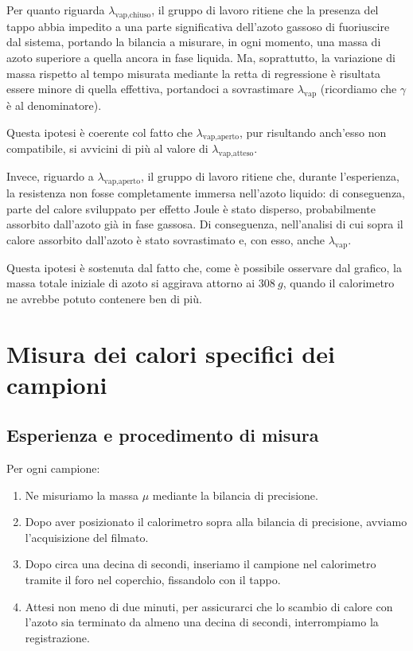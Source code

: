 \documentclass{article}
\begin{document}
\vspace{2mm}
Per quanto riguarda $\lambda_\text{vap,chiuso}$, il gruppo di
lavoro ritiene che la presenza del tappo abbia impedito a una
parte significativa dell'azoto gassoso di fuoriuscire dal sistema,
portando la bilancia a misurare, in ogni momento, una massa di
azoto superiore a quella ancora in fase liquida. Ma, soprattutto,
la variazione di massa rispetto al tempo misurata mediante la
retta di regressione è risultata essere minore di quella effettiva,
portandoci a sovrastimare $\lambda_\text{vap}$ (ricordiamo che
$\gamma$ è al denominatore).

Questa ipotesi è coerente col fatto che $\lambda_\text{vap,aperto}$,
pur risultando anch'esso non compatibile, si avvicini di più al valore
di $\lambda_\text{vap,atteso}$.

\vspace{2mm}
Invece, riguardo a $\lambda_\text{vap,aperto}$, il gruppo di
lavoro ritiene che, durante l'esperienza, la resistenza non fosse
completamente immersa nell'azoto liquido: di conseguenza, parte
del calore sviluppato per effetto Joule è stato disperso,
probabilmente assorbito dall'azoto già in fase gassosa.
Di conseguenza, nell'analisi di cui sopra il calore assorbito
dall'azoto è stato sovrastimato e, con esso, anche
$\lambda_\text{vap}$.

Questa ipotesi è sostenuta dal fatto che, come è possibile
osservare dal grafico, la massa totale iniziale di azoto si
aggirava attorno ai $\qty{308}{g}$, quando il calorimetro ne
avrebbe potuto contenere ben di più.

\section{Misura dei calori specifici dei campioni}

\subsection{Esperienza e procedimento di misura}

Per ogni campione:
\begin{enumerate}
  \item
    Ne misuriamo la massa $\mu$ mediante la bilancia di precisione.
  \item
    Dopo aver posizionato il calorimetro sopra alla bilancia di precisione,
    avviamo l'acquisizione del filmato.
  \item
    Dopo circa una decina di secondi, inseriamo il campione nel calorimetro
    tramite il foro nel coperchio, fissandolo con il tappo.
  \item
    Attesi non meno di due minuti, per assicurarci che lo scambio di calore con
    l'azoto sia terminato da almeno una decina di secondi, interrompiamo
    la registrazione.
\end{enumerate}
\end{document}
